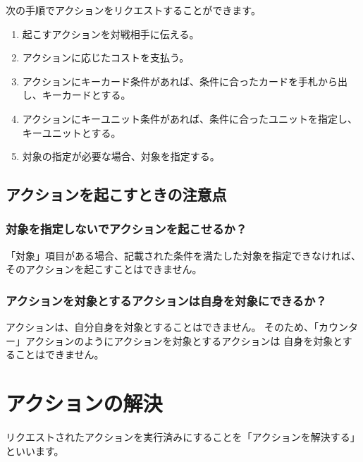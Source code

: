 \documentclass[letterpaper,10pt,dvipdfmx]{sphinxmanual}
\begin{document}
\sphinxAtStartPar
次の手順でアクションをリクエストすることができます。
\begin{enumerate}
%
\item {} 
\sphinxAtStartPar
起こすアクションを対戦相手に伝える。

\item {} 
\sphinxAtStartPar
アクションに応じたコストを支払う。

\item {} 
\sphinxAtStartPar
アクションにキーカード条件があれば、条件に合ったカードを手札から出し、キーカードとする。

\item {} 
\sphinxAtStartPar
アクションにキーユニット条件があれば、条件に合ったユニットを指定し、キーユニットとする。

\item {} 
\sphinxAtStartPar
対象の指定が必要な場合、対象を指定する。

\end{enumerate}


\subsection{アクションを起こすときの注意点}
\label{\detokenize{common/common-action:id6}}

\subsubsection{対象を指定しないでアクションを起こせるか？}
\label{\detokenize{common/common-action:id7}}
\sphinxAtStartPar
「対象」項目がある場合、記載された条件を満たした対象を指定できなければ、
そのアクションを起こすことはできません。


\subsubsection{アクションを対象とするアクションは自身を対象にできるか？}
\label{\detokenize{common/common-action:id8}}
\sphinxAtStartPar
アクションは、自分自身を対象とすることはできません。
そのため、「カウンター」アクションのようにアクションを対象とするアクションは
自身を対象とすることはできません。


\section{アクションの解決}
\label{\detokenize{common/common-action:id9}}
\sphinxAtStartPar
リクエストされたアクションを実行済みにすることを「アクションを解決する」といいます。
\end{document}
